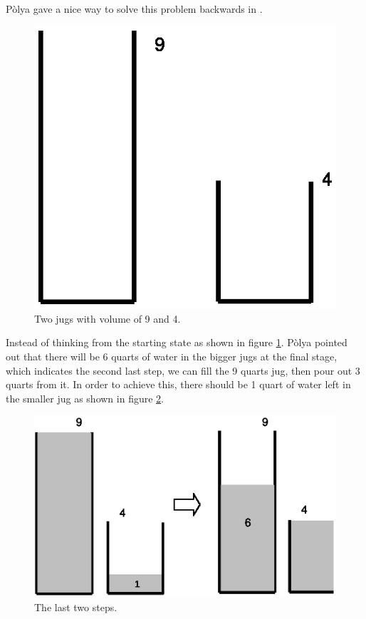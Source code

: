 \documentclass[UTF8]{article}
\begin{document}
P\`{o}lya gave a nice way to solve this problem backwards in \cite{how-to-solve-it}.

\begin{figure}[htbp]
 \centering
 \includegraphics[scale=0.5]{img/jugs-start.eps}
 \caption{Two jugs with volume of 9 and 4.}
 \label{fig:jugs-start}
\end{figure}

Instead of thinking from the starting state as shown in figure \ref{fig:jugs-start}.
P\`{o}lya pointed out that there will be 6 quarts of water in the bigger jugs
at the final stage, which indicates the second last step, we can fill the
9 quarts jug, then pour out 3 quarts from it. In order to achieve this, there
should be 1 quart of water left in the smaller jug as shown in figure
\ref{fig:jugs-r1}.

\begin{figure}[htbp]
 \centering
 \includegraphics[scale=0.5]{img/jugs-r1.eps}
 \caption{The last two steps.}
 \label{fig:jugs-r1}
\end{figure}
\end{document}
